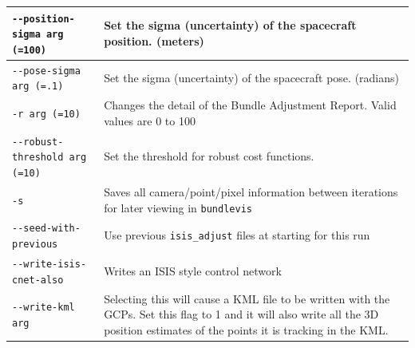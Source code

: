 \begin{longtable}{|l|p{10cm}|}
\verb#--position-sigma arg (=100)# & Set the sigma (uncertainty) of the spacecraft position. (meters) \\ \hline
\verb#--pose-sigma arg (=.1)# & Set the sigma (uncertainty) of the spacecraft pose. (radians) \\ \hline
\verb#-r arg (=10)# & Changes the detail of the Bundle Adjustment Report. Valid values are 0 to 100 \\ \hline
\verb#--robust-threshold arg (=10)# & Set the threshold for robust cost functions. \\ \hline
\verb#-s# & Saves all camera/point/pixel information between iterations for later viewing in \texttt{bundlevis} \\ \hline
\verb#--seed-with-previous# & Use previous \texttt{isis\_adjust} files at starting for this run \\ \hline
\verb#--write-isis-cnet-also# & Writes an ISIS style control network \\ \hline
\verb#--write-kml arg# & Selecting this will cause a KML file to be written with the GCPs. Set this flag to 1 and it will also write all the 3D position estimates of the points it is tracking in the KML. \\ \hline
\end{longtable}




